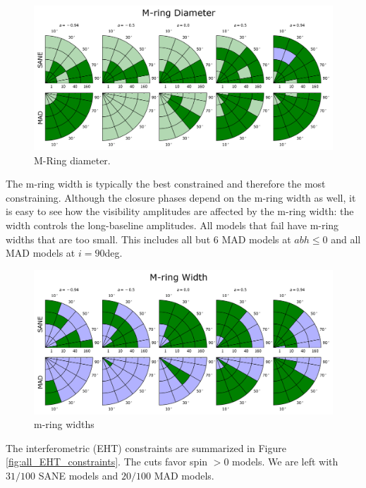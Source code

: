 \begin{figure}
  \centering
  \includegraphics[width=\columnwidth]{./figures/Mring_d_Constraints.png}
  \caption{M-Ring diameter.}
  \label{fig:cmp_m-ring_diam}
\end{figure}

The m-ring width is typically the best constrained and therefore the most constraining.  Although the closure phases depend on the m-ring width as well, it is easy to see how the visibility amplitudes are affected by the m-ring width: the width controls the long-baseline amplitudes.  All models that fail have m-ring widths that are too small.  This includes all but 6 MAD models at $abh \le 0$ and all MAD models at $i = 90$deg.

\begin{figure}
  \centering
  \includegraphics[width=\columnwidth]{./figures/Mring_w_Constraints.png}
  \caption{m-ring widths}
  \label{fig:cmp_m-ring_width}
\end{figure}


The interferometric (EHT) constraints are summarized in Figure \ref{fig:all_EHT_constraints}.  The cuts favor spin $> 0$ models.
We are left with $31/100$ SANE models and $20/100$ MAD models.

